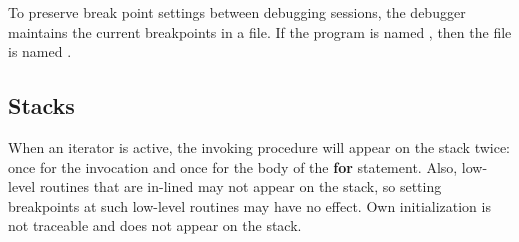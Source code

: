 To preserve break point settings between debugging sessions, the
debugger maintains the current breakpoints in a file.  If the program
is named , then the file is named .

\subsection{Stacks}

When an iterator is active, the invoking procedure will appear on the
stack twice: once for the invocation and once for the body of the {\bf
for} statement.  Also, low-level routines that are in-lined may not
appear on the stack, so setting breakpoints at such low-level routines
may have no effect.  Own initialization is not traceable and does not
appear on the stack.




